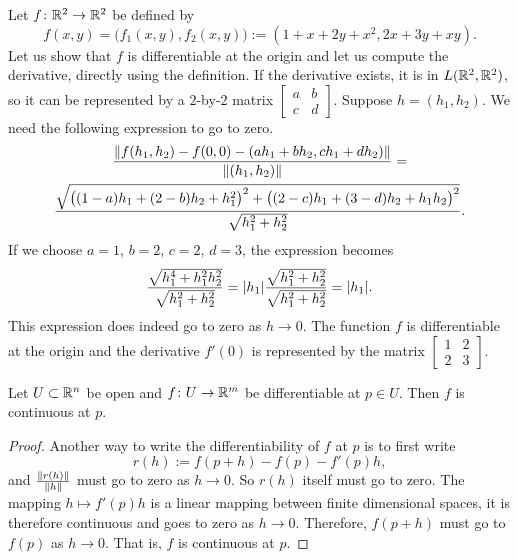 \begin{example}
Let $f \colon {\mathbb{R}}^2 \to {\mathbb{R}}^2$ be defined by
\begin{equation*}
f(x,y) = \bigl(f_1(x,y),f_2(x,y)\bigr) := (1+x+2y+x^2,2x+3y+xy).
\end{equation*}
Let us show that $f$ is differentiable at the origin and let us 
compute the derivative,
directly using the definition.  If the
derivative exists, it is in $L({\mathbb{R}}^2,{\mathbb{R}}^2)$, so it can be
represented by a $2$-by-$2$ matrix
$\left[\begin{smallmatrix}a&b\\c&d\end{smallmatrix}\right]$.  Suppose $h =
(h_1,h_2)$.  We need the following expression to go to zero.
\begin{multline*}
\frac{\lVert {
f(h_1,h_2)-f(0,0)
-
(ah_1 +bh_2 , ch_1+dh_2)} \rVert
}{\lVert {(h_1,h_2)} \rVert}
=
\\
\frac{\sqrt{
{\bigl((1-a)h_1 + (2-b)h_2 + h_1^2\bigr)}^2
+
{\bigl((2-c)h_1 + (3-d)h_2 + h_1h_2\bigr)}^2}}{\sqrt{h_1^2+h_2^2}} .
\end{multline*}
If we choose $a=1$, $b=2$, $c=2$, $d=3$, the expression becomes
\begin{equation*}
\frac{\sqrt{
h_1^4 + h_1^2h_2^2}}{\sqrt{h_1^2+h_2^2}}
=
\lvert {h_1} \rvert
\frac{\sqrt{
h_1^2 + h_2^2}}{\sqrt{h_1^2+h_2^2}}
= \lvert {h_1} \rvert .
\end{equation*}
This expression does indeed go to zero as $h \to 0$.  The
function $f$ is differentiable at the origin and 
the derivative $f'(0)$ is represented by the matrix
$\left[\begin{smallmatrix}1&2\\2&3\end{smallmatrix}\right]$.
\end{example}

\begin{prop}
Let $U \subset {\mathbb{R}}^n$ be open and $f \colon U \to {\mathbb{R}}^m$ be
differentiable at $p \in U$.  Then $f$ is continuous at $p$.
\end{prop}

\begin{proof}
Another way to write the differentiability of $f$ at $p$ is to first write
\begin{equation*}
r(h) := f(p+h)-f(p) - f'(p) h ,
\end{equation*}
and $\frac{\lVert {r(h)} \rVert}{\lVert {h} \rVert}$ must go to zero as $h \to 0$.
So
$r(h)$ itself must go to zero.  The mapping $h \mapsto f'(p) h$
is a linear mapping between finite dimensional spaces, it is
therefore continuous
and goes to zero as $h \to 0$.  Therefore,
$f(p+h)$ must go to $f(p)$ as $h \to 0$.  That is, $f$ is continuous at $p$.
\end{proof}

